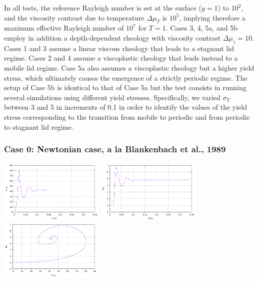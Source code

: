In all tests, the reference Rayleigh number is set at the surface ($y=1$) to $10^2$, and the viscosity contrast due to temperature $\Delta\mu_T$ is $10^5$, implying therefore a maximum effective Rayleigh number of $10^7$ for $T=1$. Cases 3, 4, 5a, and 5b employ in addition a depth-dependent rheology with viscosity contrast  $\Delta\mu_z=10$. Cases 1 and 3 assume a linear viscous rheology that leads to a stagnant lid regime. Cases 2 and 4 assume a viscoplastic rheology that leads instead to a mobile lid regime. Case 5a also assumes a viscoplastic rheology but a higher yield stress, which ultimately causes the emergence of a strictly periodic regime. The setup of Case 5b is identical to that of Case 5a but the test consists in running several simulations using different yield stresses. Specifically, we varied $\sigma_Y$ between 3 and 5 in increments of 0.1 in order to identify the values of the yield stress corresponding to the transition from mobile to periodic and from periodic to stagnant lid regime. 

\subsubsection*{Case 0: Newtonian case, a la Blankenbach et al., 1989}

\includegraphics[width=5cm]{python_codes/fieldstone_28/results_case0/vrms.pdf}
\includegraphics[width=5cm]{python_codes/fieldstone_28/results_case0/Nu.pdf}
\includegraphics[width=5cm]{python_codes/fieldstone_28/results_case0/vrms_Nu.pdf}


